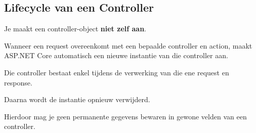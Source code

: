 \subsection{Lifecycle van een Controller}

Je maakt een controller-object \textbf{niet zelf aan}.

Wanneer een request overeenkomt met een bepaalde controller en action,
maakt ASP.NET Core automatisch een nieuwe instantie van die controller aan.

Die controller bestaat enkel tijdens de verwerking van die ene request
en response.

Daarna wordt de instantie opnieuw verwijderd.

Hierdoor mag je geen permanente gegevens bewaren in gewone velden
van een controller.